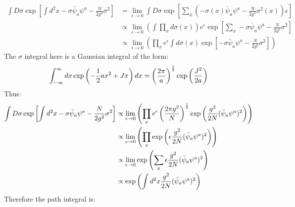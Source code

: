 \documentclass[12pt,a4]{article}
\begin{document}
\begin{enumerate}
\begin{enumerate}
        \begin{align*}
          \int D \sigma \exp\left[\int d^2x - \sigma \bar{\psi}_a \psi^a  - \frac{N}{2g^2}\sigma^2 \right] &= \lim_{\epsilon \to 0 } \int D \sigma \exp\left[\sum_x \left(- \sigma(x) \bar{\psi}_a \psi^a  - \frac{N}{2g^2}\sigma^2(x) \right) \epsilon\right] \\ 
                                                                                                           &\propto \lim_{\epsilon \to 0 } \left(\int \prod_x  d \sigma(x)\right) e^\epsilon\exp\left[\sum_x - \sigma \bar{\psi}_a \psi^a  - \frac{N}{2g^2}\sigma^2 \right] \\ 
                                                                                                           &\propto \lim_{\epsilon \to 0 } \left(\prod_x e^\epsilon \int   d \sigma(x) \exp\left[- \sigma \bar{\psi}_a \psi^a  - \frac{N}{2g^2}\sigma^2 \right] \right)
        \end{align*}
        The $\sigma$ integral here is a Gaussian integral of the form:
        \begin{equation*}
          \int_{-\infty}^{\infty} dx \exp\left( -\frac{1}{ 2} a x^2 + Jx\right)  dx = \left ( {2\pi \over a } \right) ^{1\over 2} \exp\left( { J^2 \over 2a }\right)
        \end{equation*}
        Thus:
        \begin{align*}
          \int D \sigma \exp\left[\int d^2x - \sigma \bar{\psi}_a \psi^a  - \frac{N}{2g^2}\sigma^2 \right] &\propto \lim_{\epsilon \to 0 } \left(\prod_x e^\epsilon \left ( {2\pi g^2 \over N } \right) ^{1\over 2} \exp\left( \frac{g^2}{2N}(\bar{\psi}_a \psi^a)^2\right) \right)\\
                                                                                                           &\propto \lim_{\epsilon \to 0 } \left(\prod_x  \exp\left(\epsilon \frac{g^2}{2N}(\bar{\psi}_a \psi^a)^2\right) \right)\\
                                                                                                           &\propto \lim_{\epsilon \to 0 } \exp\left(\sum_x \epsilon \frac{g^2}{2N}(\bar{\psi}_a \psi^a)^2\right) \\
                                                                                                           &\propto  \exp\left(\int d^2 x \frac{g^2}{2N}(\bar{\psi}_a \psi^a)^2\right) 
        \end{align*}
        Therefore the path integral is:
        \begin{align*}

\end{align*}
\end{enumerate}
\end{enumerate}
\end{document}
